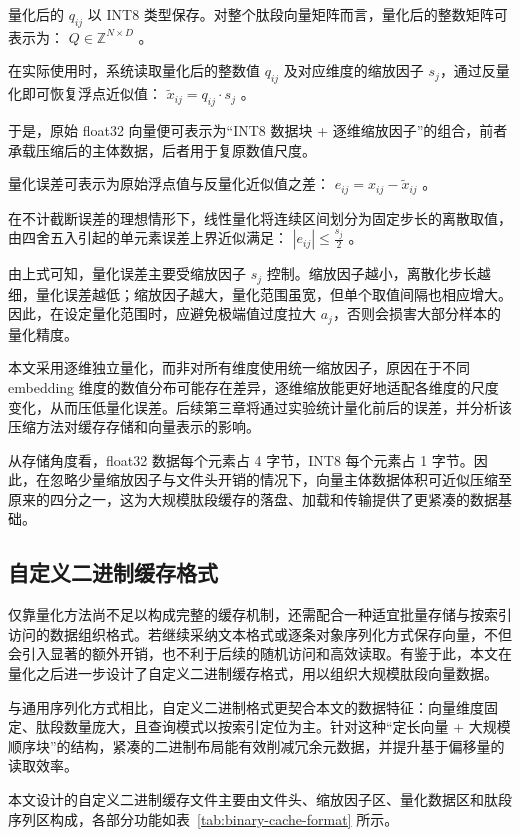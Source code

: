 量化后的 $q_{ij}$ 以 INT8 类型保存。对整个肽段向量矩阵而言，量化后的整数矩阵可表示为： $Q \in \mathbb{Z}^{N \times D}$ 。

在实际使用时，系统读取量化后的整数值 $q_{ij}$ 及对应维度的缩放因子 $s_j$，通过反量化即可恢复浮点近似值： $\widetilde{x}_{ij} = q_{ij} \cdot s_j$ 。

于是，原始 float32 向量便可表示为“INT8 数据块 + 逐维缩放因子”的组合，前者承载压缩后的主体数据，后者用于复原数值尺度。

量化误差可表示为原始浮点值与反量化近似值之差： $e_{ij} = x_{ij} - \widetilde{x}_{ij}$ 。

在不计截断误差的理想情形下，线性量化将连续区间划分为固定步长的离散取值，由四舍五入引起的单元素误差上界近似满足： $\left|e_{ij}\right| \le \frac{s_j}{2}$ 。

由上式可知，量化误差主要受缩放因子 $s_j$ 控制。缩放因子越小，离散化步长越细，量化误差越低；缩放因子越大，量化范围虽宽，但单个取值间隔也相应增大。因此，在设定量化范围时，应避免极端值过度拉大 $a_j$，否则会损害大部分样本的量化精度。

本文采用逐维独立量化，而非对所有维度使用统一缩放因子，原因在于不同 embedding 维度的数值分布可能存在差异，逐维缩放能更好地适配各维度的尺度变化，从而压低量化误差。后续第三章将通过实验统计量化前后的误差，并分析该压缩方法对缓存存储和向量表示的影响。

从存储角度看，float32 数据每个元素占 4 字节，INT8 每个元素占 1 字节。因此，在忽略少量缩放因子与文件头开销的情况下，向量主体数据体积可近似压缩至原来的四分之一，这为大规模肽段缓存的落盘、加载和传输提供了更紧凑的数据基础。

\subsection{自定义二进制缓存格式}

仅靠量化方法尚不足以构成完整的缓存机制，还需配合一种适宜批量存储与按索引访问的数据组织格式。若继续采纳文本格式或逐条对象序列化方式保存向量，不但会引入显著的额外开销，也不利于后续的随机访问和高效读取。有鉴于此，本文在量化之后进一步设计了自定义二进制缓存格式，用以组织大规模肽段向量数据。

与通用序列化方式相比，自定义二进制格式更契合本文的数据特征：向量维度固定、肽段数量庞大，且查询模式以按索引定位为主。针对这种“定长向量 + 大规模顺序块”的结构，紧凑的二进制布局能有效削减冗余元数据，并提升基于偏移量的读取效率。

本文设计的自定义二进制缓存文件主要由文件头、缩放因子区、量化数据区和肽段序列区构成，各部分功能如表~\ref{tab:binary-cache-format} 所示。

